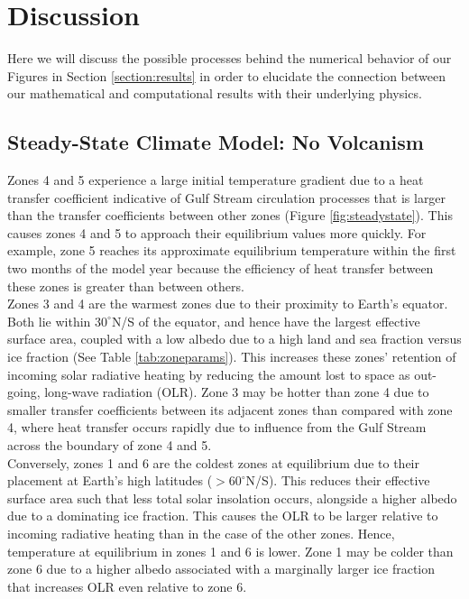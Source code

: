 \documentclass{article}
\begin{document}
\section{Discussion}
Here we will discuss the possible processes behind the numerical behavior of our
Figures in Section \ref{section:results} in order to elucidate the connection
between our mathematical and computational results with their underlying
physics.

\subsection{Steady-State Climate Model: No Volcanism}
\label{section:steadystate}
Zones 4 and 5 experience a large initial temperature gradient due to a heat
transfer coefficient indicative of Gulf Stream circulation processes that is
larger than the transfer coefficients between other zones
(Figure \ref{fig:steadystate}). This causes zones 4 and 5 to approach their
equilibrium values more quickly. For example, zone 5 reaches its approximate
equilibrium temperature within the first two months of the model year because
the efficiency of heat transfer between these zones is greater than between
others. \\

Zones 3 and 4 are the warmest zones due to their proximity to Earth's equator.
Both lie within $30^{\circ}$N/S of the equator, and hence have the largest
effective surface area, coupled with a low albedo due to a high land and sea
fraction versus ice fraction (See Table \ref{tab:zoneparams}). This increases
these zones' retention of incoming solar radiative heating by reducing the
amount lost to space as out-going, long-wave radiation (OLR). Zone 3 may be
hotter than zone 4 due to smaller transfer coefficients between its adjacent
zones than compared with zone 4, where heat transfer occurs rapidly due to
influence from the Gulf Stream across the boundary of zone 4 and 5. \\

Conversely, zones 1 and 6 are the coldest zones at equilibrium due to their
placement at Earth's high latitudes ($>60^{\circ}$N/S). This reduces their
effective surface area such that less total solar insolation occurs, alongside
a higher albedo due to a dominating ice fraction. This causes the OLR to be
larger relative to incoming radiative heating than in the case of the other
zones. Hence, temperature at equilibrium in zones 1 and 6 is lower. Zone 1 may
be colder than zone 6 due to a higher albedo associated with a marginally larger
ice fraction that increases OLR even relative to zone 6. \\
\end{document}
